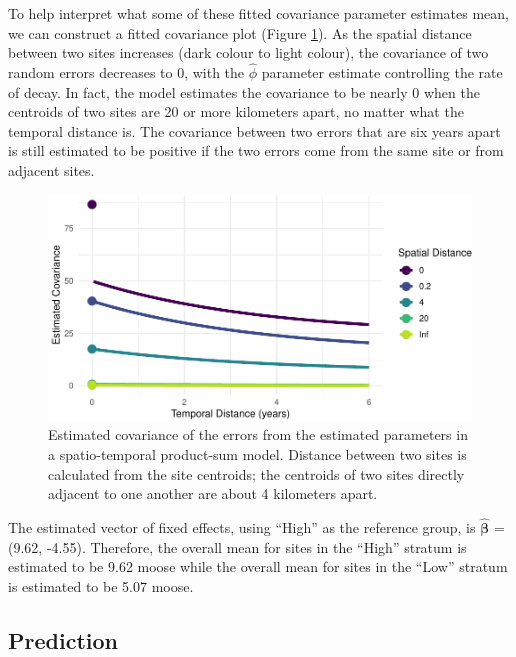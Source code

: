 \documentclass[smallextended]{svjour3}       %
\begin{document}
To help interpret what some of these fitted covariance parameter
estimates mean, we can construct a fitted covariance plot (Figure
\ref{fig:covplot}). As the spatial distance between two sites increases
(dark colour to light colour), the covariance of two random errors
decreases to 0, with the \(\hat{\phi}\) parameter estimate controlling
the rate of decay. In fact, the model estimates the covariance to be
nearly 0 when the centroids of two sites are 20 or more kilometers
apart, no matter what the temporal distance is. The covariance between
two errors that are six years apart is still estimated to be positive if
the two errors come from the same site or from adjacent sites.

\begin{figure}
\centering
\includegraphics{preprint_springer_files/figure-latex/covplot-1.pdf}
\caption{\label{fig:covplot} Estimated covariance of the errors from the
estimated parameters in a spatio-temporal product-sum model. Distance
between two sites is calculated from the site centroids; the centroids
of two sites directly adjacent to one another are about 4 kilometers
apart.}
\end{figure}

The estimated vector of fixed effects, using ``High'' as the reference
group, is \(\bm{\hat{\beta}}\) = (9.62, -4.55). Therefore, the overall
mean for sites in the ``High'' stratum is estimated to be 9.62 moose
while the overall mean for sites in the ``Low'' stratum is estimated to
be 5.07 moose.

\hypertarget{prediction}{%
\subsection{Prediction}\label{prediction}}
\end{document}

